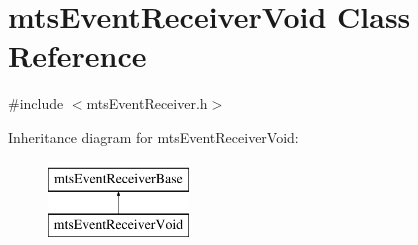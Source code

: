\hypertarget{classmts_event_receiver_void}{\section{mts\-Event\-Receiver\-Void Class Reference}
\label{classmts_event_receiver_void}
}


{\ttfamily \#include $<$mts\-Event\-Receiver.\-h$>$}

Inheritance diagram for mts\-Event\-Receiver\-Void\-:\begin{figure}[H]
\begin{center}
\leavevmode
\includegraphics[height=2.000000cm]{d5/d12/classmts_event_receiver_void}
\end{center}
\end{figure}
